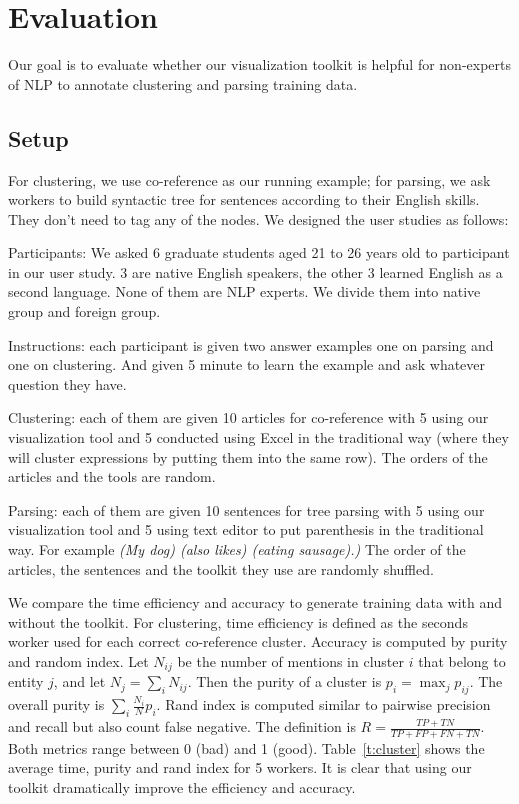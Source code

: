 \section{Evaluation}
Our goal is to evaluate whether our visualization toolkit is helpful for non-experts of NLP to annotate clustering and parsing training data. 

\subsection{Setup}
For clustering, we use co-reference as our running example; for parsing, we ask workers to build syntactic tree for sentences according to their English skills. They don't need to tag any of the nodes. We designed the user studies as follows:
\bi
\item Participants: We asked 6 graduate students aged 21 to 26 years old to participant in our user study. 3 are native English speakers, the other 3 learned English as a second language. None of them are NLP experts. We divide them into native group and foreign group.
\item Instructions: each participant is given two answer examples one on parsing and one on clustering. And given 5 minute to learn the example and ask whatever question they have.
\item Clustering: each of them are given 10 articles for co-reference with 5 using our visualization tool and 5 conducted using Excel in the traditional way (where they will cluster expressions by putting them into the same row). The orders of the articles and the tools are random.
\item Parsing: each of them are given 10 sentences for tree parsing with 5 using our visualization tool and 5 using text editor to put parenthesis in the traditional way. For example {\em (My dog) (also likes) (eating sausage).)}
\ei 
The order of the articles, the sentences and the toolkit they use are randomly shuffled.

We compare the time efficiency and accuracy to generate training data with and without the toolkit. For clustering, time efficiency is defined as the seconds worker used for each correct co-reference cluster. Accuracy is computed by purity and random index. Let $N_{ij}$ be the number of mentions in cluster $i$ that belong to entity $j$, and let $N_j=\sum_i N_{ij}$. Then the purity of a cluster is $p_i=\max_j p_{ij}$. The overall purity is $\sum_i \frac{N_i}{N} p_i$. Rand index is computed similar to pairwise precision and recall but also count false negative. The definition is $R=\frac{TP+TN}{TP+FP+FN+TN}$. Both metrics range between 0 (bad) and 1 (good). Table~\ref{t:cluster} shows the average time, purity and rand index for 5 workers. It is clear that using our toolkit dramatically improve the efficiency and accuracy.

